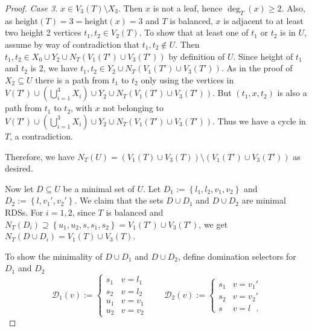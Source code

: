\documentclass[12pt, reqno]{amsart}
\theoremstyle{definition}
\theoremstyle{plain}
\theoremstyle{definition}
\newcommand{\hh}{\mbox{height}}
\newcommand\set[1]{\left\lbrace #1 \right\rbrace}
\newcommand{\calD}{\mathcal{D}}
\begin{document}
\begin{proof}
    \emph{Case 3.} $x \in V_3(T)\setminus X_3$.
    Then $x$ is not a leaf, hence $\deg_T(x) \geq 2$. 
    Also, as $\hh(T) = 3=\hh(x) = 3$ and $T$ is balanced, $x$ is adjacent to at least two height 2 vertices $t_1,t_2 \in V_2(T)$.
    To show that at least one of $t_1$ or $t_2$ is in $U$, assume by way of contradiction that $t_1,t_2 \not\in U$.
    Then $t_1,t_2 \in X_0 \cup Y_2 \cup N_T(V_1(T') \cup V_3(T'))$ by definition of $U$.
    Since height of $t_1$ and $t_2$ is 2, we have $t_1,t_2 \in Y_2 \cup N_T(V_1(T') \cup V_3(T'))$.
    As in the proof of $X_2 \subseteq U$ there is a path from $t_1$ to $t_2$ only using the vertices in $V(T') \cup \left(\bigcup_{i = 1}^3X_i\right) \cup Y_2 \cup N_T(V_1(T') \cup V_3(T'))$. 
    But $(t_1, x, t_2)$ is also a path from $t_1$ to $t_2$, with $x$ not belonging to $V(T') \cup \left(\bigcup_{i = 1}^3X_i\right) \cup Y_2 \cup N_T(V_1(T') \cup V_3(T'))$.
    Thus we have a cycle in $T$, a contradiction.

    Therefore, we have $N_T(U) = (V_1(T) \cup V_3(T)) \setminus (V_1(T') \cup V_3(T'))$ as desired.

    
    Now let $D \subseteq U$ be a minimal set of $U$.
    Let $D_1 := \set{l_1,l_2,v_1,v_2}$ and $D_2 := \set{l,v_1',v_2'}$.
    We claim that the sets $D \cup D_1$ and $D \cup D_2$ are minimal RDSs.
    For $i = 1,2$, since $T$ is balanced and $N_T(D_i) \supseteq \set{u_1,u_2,s,s_1,s_2} = V_1(T') \cup V_3(T')$, we get $N_T(D \cup D_i) = V_1(T) \cup V_3(T)$.

    To show the minimality of $D \cup D_1$ and $D \cup D_2$, define domination selectors for $D_1$ and $D_2$
    $$
    \calD_1(v) := \begin{cases}
    s_1 & v = l_1\\
    s_2 & v = l_2\\
    u_1 & v = v_1\\
    u_2 & v = v_2
    \end{cases}
    \qquad
    \calD_2(v) := \begin{cases}
        s_1 & v = v_1'\\
        s_2 & v = v_2'\\
        s & v = l\ \ \ .
    \end{cases}
    $$


\end{proof}
\end{document}
